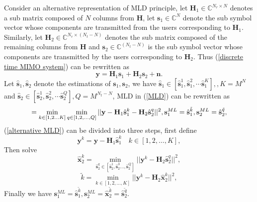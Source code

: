 \documentclass[12pt, draftclsnofoot, onecolumn]{IEEEtran}
\begin{document}
Consider an alternative representation of MLD principle, let $\mathbf{H}_{1}\in \mathbb{C}^{N_{r}\times N}$ denotes a sub matrix composed of $N$ columns from $\mathbf{H}$, let $\mathbf{s}_{1}\in \mathbb{C}^{N}$ denote the sub symbol vector whose components are transmitted from the users corresponding to $\mathbf{H}_{1}$. Similarly, let $\mathbf{H}_{2}\in \mathbb{C}^{N_{r}\times (N_{t}-N)}$ denotes the sub matrix composed of the remaining columns from $\mathbf{H}$ and $\mathbf{s}_{2}\in \mathbb{C}^{(N_{t}-N)}$ is the sub symbol vector whose components are transmitted by the users corresponding to $\mathbf{H}_{2}$. Thus (\ref{discrete time MIMO system}) can be rewritten as 
\begin{equation}
\mathbf{y}=\mathbf{H}_{1}\mathbf{s}_{1}+\mathbf{H}_{2}\mathbf{s}_{2}+\mathbf{n}.
\label{alternative MIMO system}
\end{equation}  
Let $\hat{\mathbf{s}}_{1}, \hat{\mathbf{s}}_{2}$ denote the estimations of $\mathbf{s}_{1}, \mathbf{s}_{2}$, we have $\hat{\mathbf{s}}_{1}\in [\hat{\mathbf{s}}^{1}_{1}, \hat{\mathbf{s}}^{2}_{1}, \cdots \hat{\mathbf{s}}^{K}_{1}],, K=M^{N}$ and $\hat{\mathbf{s}}_{2}\in [\hat{\mathbf{s}}^{1}_{2}, \hat{\mathbf{s}}^{2}_{2}, \cdots \hat{\mathbf{s}}^{Q}_{2}], Q=M^{N_{t}-N}$, MLD in (\ref{MLD}) can be rewritten as 
\begin{equation}
[\tilde{k}, \tilde{q}]=\min_{k\in [1,2\ldots K]}\min_{q\in [1,2,\ldots, Q]}||\mathbf{y}-\mathbf{H}_{1}\hat{\mathbf{s}}^{k}_{1}-\mathbf{H}_{2}\hat{\mathbf{s}}^{q}_{2}||^{2},\\
\mathbf{s}^{ML}_{1}=\hat{\mathbf{s}}^{\tilde{k}}_{1}, \mathbf{s}^{ML}_{2}=\hat{\mathbf{s}}^{\tilde{q}}_{2},
\label{alternative MLD}
\end{equation}
(\ref{alternative MLD}) can be divided into three steps, first define 
\begin{equation}
\mathbf{y}^{k}=\mathbf{y}-\mathbf{H}_{1}\hat{\mathbf{s}}^{k}_{1}\quad k\in [1,2,\ldots, K],
\label{first step alternative MLD}
\end{equation}
Then solve 
\begin{equation}
\hat{\mathbf{x}}_{2}^{k}=\min_{\hat{\mathbf{s}}_{2}^{q}\in [\hat{\mathbf{s}}_{2}^{1},\hat{\mathbf{s}}_{2}^{3}\ldots, \hat{\mathbf{s}}_{2}^{Q}]}||\mathbf{y}^{k}-\mathbf{H}_{2}\hat{\mathbf{s}}_{2}^{q}||^{2}, 
\label{second step alternative MLD}
\end{equation}
\begin{equation}
\tilde{k}=\min_{k\in [1,2,\ldots, K]}||\mathbf{y}^{k}-\mathbf{H}_{2}\hat{\mathbf{x}}_{2}^{k}||^{2},
\label{third step alternative MLD}
\end{equation}
Finally we have $\mathbf{s}_{1}^{ML}=\hat{\mathbf{s}}_{1}^{\tilde{k}}, \mathbf{s}_{2}^{ML}=\hat{\mathbf{x}}_{2}^{\tilde{k}}=\hat{\mathbf{s}}_{2}^{\tilde{q}}$.
\end{document}

